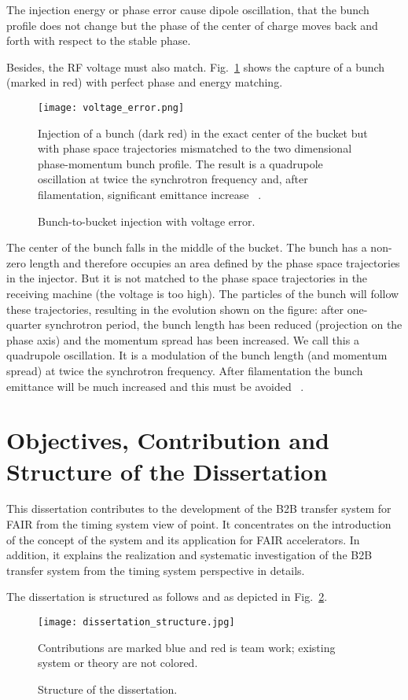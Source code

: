 The injection energy or phase error cause dipole oscillation, that the bunch profile does not change but the phase of the center of charge moves back and forth with respect to the stable phase. 

Besides, the RF voltage must also match. Fig.~\ref{voltage_error} shows the capture of a bunch (marked in red) with perfect phase and energy matching. 
\begin{figure}[!htb]
   \centering   
   \texttt{[image: voltage\_error.png]}
   \caption{Bunch-to-bucket injection with voltage error.}{Injection of a bunch (dark red) in the exact center of the bucket but with phase space trajectories mismatched to the two dimensional phase-momentum bunch profile. The result is a quadrupole oscillation at twice the synchrotron frequency and, after filamentation, significant emittance increase ~\cite{baudrenghien_low-level_2010}.}
   \label{voltage_error}
\end{figure}

The center of the bunch falls in the middle of the bucket. The bunch has a non-zero length and therefore occupies an area defined by the
phase space trajectories in the injector. But it is not matched to the phase space trajectories in the receiving machine (the voltage is too high). The particles of the bunch will follow these trajectories, resulting in the evolution shown on the figure: after one-quarter synchrotron period, the bunch length has been reduced (projection on the phase axis) and the momentum spread has been increased. We call
this a quadrupole oscillation. It is a modulation of the bunch length (and momentum spread) at twice the synchrotron frequency. After filamentation the bunch emittance will be much increased and this must be avoided ~\cite{baudrenghien_low-level_2010}.


\section{Objectives, Contribution and Structure of the Dissertation}
This dissertation contributes to the development of the B2B transfer system for FAIR from the timing system view of point. It concentrates on the introduction of the concept of the system and its application for FAIR accelerators. In addition, it explains the realization and systematic investigation of the B2B transfer system from the timing system perspective in details.

The dissertation is structured as follows and as depicted in Fig.~\ref{dissertation_structure}.
\begin{figure}[H]
   \centering   
   \texttt{[image: dissertation\_structure.jpg]}
   \caption{Structure of the dissertation.}{Contributions are marked blue and red is team work; existing system or theory are not colored.}
   \label{dissertation_structure}
\end{figure}

